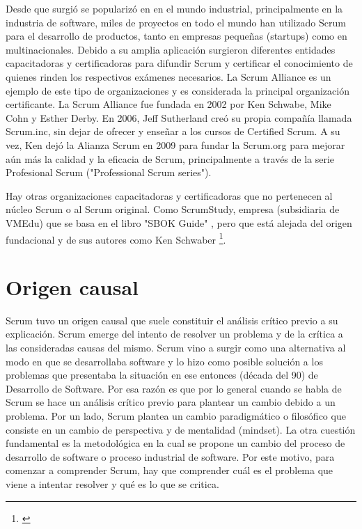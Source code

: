 Desde que surgió se popularizó en en el mundo industrial, principalmente en la industria de software, miles de proyectos en todo el mundo han utilizado Scrum para el desarrollo de productos, tanto en empresas pequeñas (startups) como en multinacionales. Debido a su amplia aplicación surgieron diferentes entidades capacitadoras y certificadoras para difundir Scrum y certificar el conocimiento de quienes rinden los respectivos exámenes necesarios. La Scrum Alliance \cite{Scrum-Alliance-2015} es un ejemplo de este tipo de organizaciones y es considerada la principal organización certificante. La Scrum Alliance fue fundada en 2002 por Ken Schwabe, Mike Cohn y Esther Derby. En 2006, Jeff Sutherland creó su propia compañía llamada Scrum.inc, sin dejar de ofrecer y enseñar a los cursos de Certified Scrum. A su vez, Ken dejó la Alianza Scrum en 2009 para fundar la Scrum.org para mejorar aún más la calidad y la eficacia de Scrum, principalmente a través de la serie Profesional Scrum ("Professional Scrum series"). 

Hay otras organizaciones capacitadoras y certificadoras que no pertenecen al núcleo Scrum o al Scrum original. Como ScrumStudy, empresa (subsidiaria de VMEdu) que se basa en el libro "SBOK Guide" \cite{SBOK-2013}, pero que está alejada del origen fundacional y de sus autores como Ken Schwaber \footnote{\cite{Don-Kim-2016}}.

\section{Origen causal}

Scrum tuvo un origen causal que suele constituir el análisis crítico previo a su explicación. Scrum emerge del intento de resolver un problema y de la crítica a las consideradas causas del mismo. Scrum vino a surgir como una alternativa al modo en que se desarrollaba software y lo hizo como posible solución a los problemas que presentaba la situación en ese entonces (década del 90) de Desarrollo de Software. Por esa razón es que por lo general cuando se habla de Scrum se hace un análisis crítico previo para plantear un cambio debido a un problema. Por un lado, Scrum plantea un cambio paradigmático o filosófico que consiste en un cambio de perspectiva y de mentalidad (mindset). La otra cuestión fundamental es la metodológica en la cual se propone un cambio del proceso de desarrollo de software o proceso industrial de software. Por este motivo, para comenzar a comprender Scrum, hay que comprender cuál es el problema que viene a intentar resolver y qué es lo que se critica.

